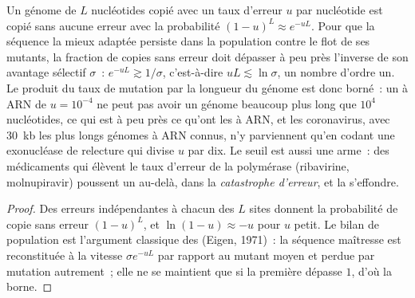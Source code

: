 \begin{proposition}\label{prop:b3:virology:error-threshold}
Un génome de $L$ nucléotides copié avec un taux d'erreur $u$ par
nucléotide est copié sans aucune erreur avec la probabilité
$(1-u)^{L} \approx e^{-uL}$. Pour que la séquence la mieux adaptée
persiste dans la population contre le flot de ses mutants, la fraction
de copies sans erreur doit dépasser à peu près l'inverse de son
avantage sélectif $\sigma$~: $e^{-uL} \gtrsim
1/\sigma$, c'est-à-dire $uL \lesssim \ln\sigma$, un nombre d'ordre un.
Le produit du taux de mutation par la longueur du génome est donc
borné~: un  à ARN de $u = 10^{-4}$ ne peut pas avoir un génome
beaucoup plus long que $10^{4}$ nucléotides, ce qui est à peu près ce
qu'ont les  à ARN, et les coronavirus, avec \qty{30}{kb} les plus
longs génomes à ARN connus, n'y parviennent qu'en codant une
exonucléase de relecture qui divise $u$ par dix. Le seuil est aussi une
arme~: des médicaments qui élèvent le taux d'erreur de la polymérase
(ribavirine, molnupiravir) poussent un  au-delà, dans la
\emph{catastrophe d'erreur}, et la  s'effondre.
\end{proposition}
\begin{proof}
Des erreurs indépendantes à chacun des $L$ sites donnent la probabilité
de copie sans erreur $(1-u)^{L}$, et $\ln(1-u) \approx -u$ pour $u$
petit. Le bilan de population est l'argument classique des
 (Eigen, 1971)~: la séquence maîtresse est reconstituée à
la vitesse $\sigma e^{-uL}$ par rapport au mutant moyen et perdue par
mutation autrement~; elle ne se maintient que si la première dépasse
$1$, d'où la borne.
\end{proof}

